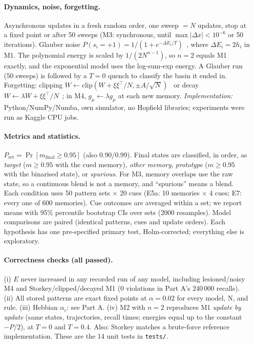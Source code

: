 \documentclass[10pt,a4paper]{article}
\newcommand{\Pret}{P_{\mathrm{ret}}}
\begin{document}
\paragraph{Dynamics, noise, forgetting.} Asynchronous updates in a fresh random order, one sweep $=N$ updates,
stop at a fixed point or after 50 sweeps (M3: synchronous, until $\max|\Delta x|<10^{-6}$ or 50 iterations).
Glauber noise $P(s_i=+1)=1/(1+e^{-\Delta E_i/T})$~\cite{glauber63}, where $\Delta E_i=2h_i$ in M1. The polynomial energy is scaled by
$1/(2N^{n-1})$, so $n=2$ equals M1 exactly, and the exponential model uses the log-sum-exp energy. A Glauber run
(50 sweeps) is followed by a $T=0$ quench to classify the basin it ended in. Forgetting: clipping
$W\leftarrow\mathrm{clip}(W+\xi\xi^\top/N,\pm A/\sqrt N)$~\cite{parisi86} or decay $W\leftarrow\lambda W+\xi\xi^\top/N$~\cite{nadal86,mezard86};
in M4, $g_\mu\leftarrow\lambda g_\mu$ at each new memory.
\textit{Implementation:} Python/NumPy/Numba, own simulator, no Hopfield libraries; experiments were run as Kaggle CPU jobs.

\paragraph{Metrics and statistics.} $\Pret=\Pr[m_{\mathrm{final}}\ge0.95]$ (also 0.90/0.99). Final states are classified, in order, as
\emph{target} ($m\ge0.95$ with the cued memory), \emph{other memory}, \emph{prototype} ($m\ge0.95$ with the binarised state), or
\emph{spurious}. For M3, memory overlaps use the raw state, so a continuous blend is not a memory, and ``spurious'' means a blend. Each
condition uses 50 pattern sets $\times$ 20 cues (E5a: 10 memories $\times$ 4 cues; E7: every one of 600 memories).
Cue outcomes are averaged within a set; we report means with 95\% percentile bootstrap CIs over sets (2000 resamples).
Model comparisons are paired (identical patterns, cues and update orders). Each hypothesis has one pre-specified
primary test, Holm-corrected; everything else is exploratory.

\paragraph{Correctness checks (all passed).} (i) $E$ never increased in any recorded run of any model, including
lesioned/noisy M4 and Storkey/clipped/decayed M1 (0 violations in Part A's 240\,000 recalls). (ii) All stored patterns are exact fixed
points at $\alpha=0.02$ for every model, N, and rule. (iii) Hebbian $\alpha_c$: see Part A. (iv) M2 with $n=2$ reproduces
M1 \emph{update by update} (same states, trajectories, recall times; energies equal up to the constant $-P/2$), at $T=0$ and $T=0.4$.
Also: Storkey matches a brute-force reference implementation. These are the 14 unit tests in \texttt{tests/}.
\end{document}
